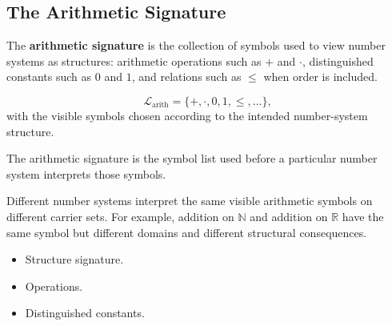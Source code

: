\subsection{The Arithmetic Signature}
\label{subsec:arithmetic-signature}

\begin{definition}
\label{def:arithmetic-signature}
The \textbf{arithmetic signature} is the collection of symbols used to view
number systems as structures: arithmetic operations such as $+$ and $\cdot$,
distinguished constants such as $0$ and $1$, and relations such as $\leq$ when
order is included.
\end{definition}

\begin{remark*}
\[
\mathcal{L}_{\mathrm{arith}}
=\{+,\cdot,0,1,\leq,\ldots\},
\]
with the visible symbols chosen according to the intended number-system
structure.
\end{remark*}

\begin{remark*}
The arithmetic signature is the symbol list used before a particular number
system interprets those symbols.
\end{remark*}


\begin{remark*}[Interpretation]
Different number systems interpret the same visible arithmetic symbols on
different carrier sets.  For example, addition on $\mathbb{N}$ and addition on
$\mathbb{R}$ have the same symbol but different domains and different
structural consequences.
\end{remark*}

\begin{remark*}[Dependencies]
\begin{itemize}
  \item Structure signature.
  \item Operations.
  \item Distinguished constants.
\end{itemize}
\end{remark*}
